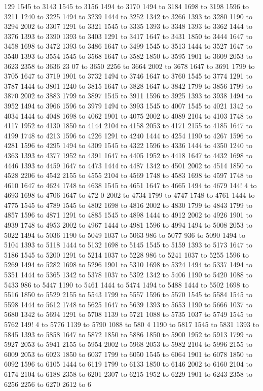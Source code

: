 129 1545 to 3143 1545 to 3156 1494
 to 3170 1494 to 3184 1698 to 3198 1596 to 3211 1240 to 3225 1494 to 3239 1444 to 3252 1342 to 3266 1393 to 3280 1190 to 3294 2002 to 3307 1291 to 3321 1545 to 3335 1393 to 3348 1393 to 3362 1444 to 3376 1393 to 3390 1393 to 3403 1291 to 3417 1647 to 3431 1850 to 3444 1647 to 3458 1698 to 3472 1393 to 3486 1647 to 3499 1545 to 3513 1444 to 3527 1647 to 3540 1393 to 3554 1545 to 3568 1647 to 3582 1850 to 3595 1901 to 3609 2053 to 3623 2358 to 3636 23
07 to 3650 2256 to 3664 2002 to 3678 1647 to 3691 1799 to 3705 1647 to 3719 1901 to 3732 1494 to 3746 1647 to 3760 1545 to 3774 1291 to 3787 1444 to 3801 1240 to 3815 1647 to 3828 1647 to 3842 1799 to 3856 1799 to 3870 2002 to 3883 1799 to 3897 1545 to 3911 1596 to 3925 1393 to 3938 1494 to 3952 1494 to 3966 1596 to 3979 1494 to 3993 1545 to 4007 1545 to 4021 1342 to 4034 1444 to 4048 1698 to 4062 1901 to 4075 2002 to 4089 2104 to 4103 1748 to 4117 1952 to 4130 1850 to 4144 2104 to 4158 2053 to 4171 2155 to 4185 1647 to 4199 1748 to 4213 1596 to 4226 1291 to 4240 1444 to 4254 1190 to 4267 1596 to 4281 1596 to 4295 1494 to 4309 1545 to 4322 1596 to 4336 1444 to 4350 1240 to 4363 1393 to 4377 1952 to 4391 1647 to 4405 1952 to 4418 1647 to 4432 1698 to 4446 1393 to 4459 1647 to 4473 1444 to 4487 1342 to 4501 2002 to 4514 1850 to 4528 2206 to 4542 2155 to 4555 2104 to 4569 1748 to 4583 1698 to 4597 1748 to 4610 1647 to 4624 1748 to 4638 1545 to 4651 1647 to 4665 1494 to 4679 144!
4 to 4693 1698 to 4706 1647 to 472
0 2002 to 4734 1799 to 4747 1748 to 4761 1444 to 4775 1545 to 4789 1545 to 4802 1698 to 4816 2002 to 4830 1799 to 4843 1799 to 4857 1596 to 4871 1291 to 4885 1545 to 4898 1444 to 4912 2002 to 4926 1901 to 4939 1748 to 4953 2002 to 4967 1444 to 4981 1596 to 4994 1494 to 5008 2053 to 5022 1494 to 5036 1190 to 5049 1037 to 5063 986 to 5077 936 to 5090 1494 to 5104 1393 to 5118 1444 to 5132 1698 to 5145 1545 to 5159 1393 to 5173 1647 to 5186 1545 to 5200 1291 to 5214 1037 to 5228 986 to 5241 1037 to 5255 1596 to 5269 1494 to 5282 1698 to 5296 1901 to 5310 1698 to 5324 1494 to 5337 1494 to 5351 1444 to 5365 1342 to 5378 1037 to 5392 1342 to 5406 1190 to 5420 1088 to 5433 986 to 5447 1190 to 5461 1444 to 5474 1494 to 5488 1444 to 5502 1698 to 5516 1850 to 5529 2155 to 5543 1799 to 5557 1596 to 5570 1545 to 5584 1545 to 5598 1444 to 5612 1748 to 5625 1647 to 5639 1393 to 5653 1190 to 5666 1037 to 5680 1342 to 5694 1291 to 5708 1139 to 5721 1088 to 5735 1037 to 5749 1545 to 5762 149!
4 to 5776 1139 to 5790 1088 to 580
4 1190 to 5817 1545 to 5831 1393 to 5845 1393 to 5858 1647 to 5872 1850 to 5886 1850 to 5900 1952 to 5913 1799 to 5927 2053 to 5941 2155 to 5954 2002 to 5968 2053 to 5982 2104 to 5996 2155 to 6009 2053 to 6023 1850 to 6037 1799 to 6050 1545 to 6064 1901 to 6078 1850 to 6092 1596 to 6105 1444 to 6119 1799 to 6133 1850 to 6146 2002 to 6160 2104 to 6174 2104 to 6188 2358 to 6201 2307 to 6215 1952 to 6229 1901 to 6243 2358 to 6256 2256 to 6270 2612 to 6
